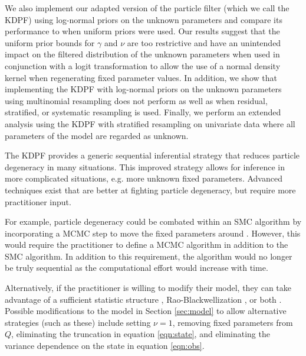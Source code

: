 We also implement our adapted version of the \citet{Liu:West:comb:2001} particle filter (which we call the KDPF) using log-normal priors on the unknown parameters and compare its performance to when uniform priors were used. Our results suggest that the uniform prior bounds for $\gamma$ and $\nu$ are too restrictive and have an unintended impact on the filtered distribution of the unknown parameters when used in conjunction with a logit transformation to allow the use of a normal density kernel when regenerating fixed parameter values. In addition, we show that implementing the KDPF with log-normal priors on the unknown parameters using multinomial resampling does not perform as well as when residual, stratified, or systematic resampling is used. Finally, we perform an extended analysis using the KDPF with stratified resampling on univariate data where all parameters of the model are regarded as unknown.

The KDPF provides a generic sequential inferential strategy that reduces particle degeneracy in many situations. This improved strategy allows for inference in more complicated situations, e.g. more unknown fixed parameters. Advanced techniques exist that are better at fighting particle degeneracy, but require more practitioner input.

For example, particle degeneracy could be combated within an SMC algorithm by incorporating a MCMC step to move the fixed parameters around \citep{Gilk:Berz:foll:2001,Stor:part:2002}. However, this would require the practitioner to define a MCMC algorithm in addition to the SMC algorithm. In addition to this requirement, the algorithm would no longer be truly sequential as the computational effort would increase with time.

Alternatively, if the practitioner is willing to modify their model, they can take advantage of a sufficient statistic structure \citep{Fear:mark:2002}, Rao-Blackwellization \citep{Douc:Gods:Andr:on:2000}, or both \citep{carvalho2010particle}. Possible modifications to the model in Section \ref{sec:model} to allow alternative strategies (such as these) include setting $\nu=1$, removing fixed parameters from $Q$, eliminating the truncation in equation \eqref{eqn:state}, and eliminating the variance dependence on the state in equation \eqref{eqn:obs}.


